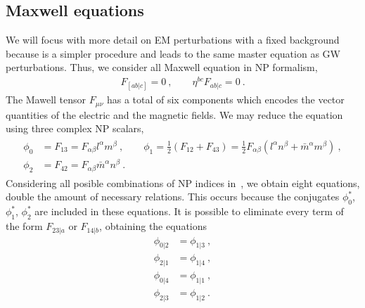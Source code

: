 \subsection{Maxwell equations}

We will focus with more detail on EM perturbations with a fixed background because is a simpler procedure and leads to the same master equation as GW perturbations. Thus, we consider all Maxwell equation in NP formalism,
\begin{align}
    F_{[ab \rvert c]} = 0 ~,\qquad \eta^{bc} F_{ab \rvert c} = 0 ~.
    \label{eq2:maxwellFabEqs}
\end{align}
The Mawell tensor $F_{\mu\nu}$ has a total of six components which encodes the vector quantities of the electric and the magnetic fields. We may reduce the equation using three complex NP scalars,
\begin{align}
    \begin{split}
        \phi_0 &= F_{13} = F_{\alpha\beta} l^\alpha m^\beta ~,\qquad
        \phi_1 = \tfrac{1}{2} (F_{12} + F_{43}) = \tfrac{1}{2} F_{\alpha\beta} (l^\alpha n^\beta + \bar{m}^\alpha m^\beta) ~,\\
        \phi_2 &= F_{42} = F_{\alpha\beta} \bar{m}^\alpha n^\beta ~.
    \end{split}
    \label{eq2:maxwellNPphi}
\end{align}
Considering all posible combinations of NP indices in~, we obtain eight equations, double the amount of necessary relations. 
This occurs because the conjugates $\phi_0^*$, $\phi_1^*$, $\phi_2^*$ are included in these equations. It is possible to eliminate every term of the form $F_{23\rvert a}$ or $F_{14\rvert b}$, obtaining the equations
\begin{subequations}
    \begin{align}
      \phi_{0\rvert 2} &= \phi_{1 \rvert 3} ~,\\
      \phi_{2\rvert 1} &= \phi_{1 \rvert 4} ~,\\
      \phi_{0\rvert 4} &= \phi_{1 \rvert 1} ~,\\
      \phi_{2\rvert 3} &= \phi_{1 \rvert 2} ~.
    \end{align}
\end{subequations}


\cleardoublepage